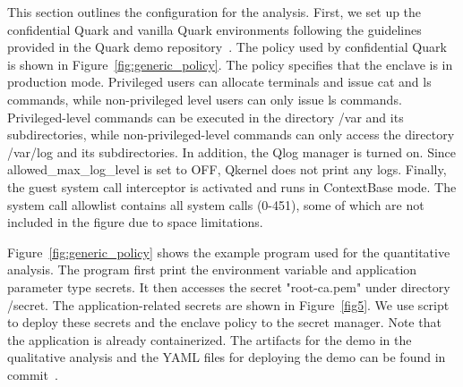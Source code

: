 This section outlines the configuration for the analysis. First, we set up the confidential Quark and vanilla Quark environments following the guidelines provided in the Quark demo repository~\cite*{Qaurk_Demo_for_qualitativ}. The policy used by confidential Quark is shown in Figure~\ref{fig:generic_policy}. The policy specifies that the enclave is in production mode. 
Privileged users can allocate terminals and issue cat and ls commands, while non-privileged level users can only issue ls commands. Privileged-level commands can be executed in the directory /var and its subdirectories, while non-privileged-level commands can only access the directory /var/log and its subdirectories. In addition, the Qlog manager is turned on. 
Since allowed\_max\_log\_level is set to OFF, Qkernel does not print any logs. Finally, the guest system call interceptor is activated and runs in ContextBase mode. The system call allowlist contains all system calls (0-451), some of which are not included in the figure due to space limitations.


Figure~\ref{fig:generic_policy} shows the example program used for the quantitative analysis. The program first print the environment variable and application parameter type secrets. It then accesses the secret "root-ca.pem" under directory /secret. The application-related secrets are shown in Figure~\ref{fig5}. We use 
script~\cite*{secret_uploading_script} to deploy these secrets and the enclave policy to the secret manager. Note that the application is already containerized. The artifacts for the demo in the qualitative analysis and the YAML files for deploying the demo can be found in commit~\cite*{artifacts_quarlitative}.

